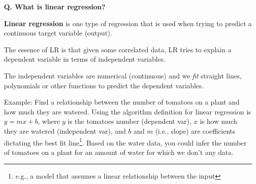 \begin{frame}[fragile]{\textbf{Q. What is linear regression?}}
  \begin{wideitemize}
  \item \textbf{Linear regression} is one type of regression that is used when
  trying to predict a continuous target variable (output).\medskip
  \begin{wideitemize}
    \item The essence of LR is that given some correlated data, LR tries to
      explain a dependent variable in terms of independent variables.
    \item The independent variables are numerical (continuous) and we \textit{fit} straight
      lines, polynomials or other functions to predict the dependent variables.
  \end{wideitemize}
  \item Example: Find a relationship between the number of tomatoes on a plant
    and how much they are watered. Using the algorithm definition for linear
    regression is $y = mx + b$, where $y$ is the tomatoes number (dependent
    var), $x$ is how much they are watered (independent var), and $b$ and $m$
    (i.e., slope) are coefficients dictating the best fit line\footnote{e.g., a
      model that assumes a linear relationship between the input}.
    {\footnotesize Based on the water data, you could infer the number of tomatoes on a
      plant for an amount of water for which we don't any data.}\medskip
  \end{wideitemize}
\end{frame}

